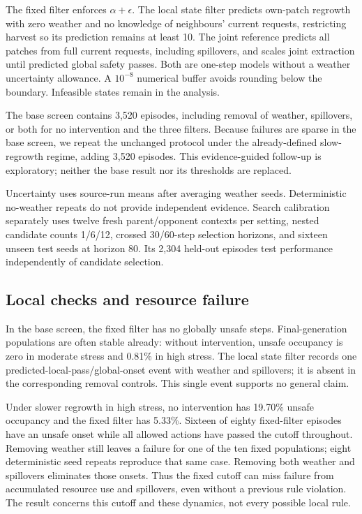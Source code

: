 \documentclass[10pt]{article}
\begin{document}
The fixed filter enforces $\alpha+\epsilon$. The local state filter predicts own-patch regrowth with zero weather and no knowledge of neighbours' current requests, restricting harvest so its prediction remains at least 10. The joint reference predicts all patches from full current requests, including spillovers, and scales joint extraction until predicted global safety passes. Both are one-step models without a weather uncertainty allowance. A $10^{-8}$ numerical buffer avoids rounding below the boundary. Infeasible states remain in the analysis.

The base screen contains 3,520 episodes, including removal of weather, spillovers, or both for no intervention and the three filters. Because failures are sparse in the base screen, we repeat the unchanged protocol under the already-defined slow-regrowth regime, adding 3,520 episodes. This evidence-guided follow-up is exploratory; neither the base result nor its thresholds are replaced.

Uncertainty uses source-run means after averaging weather seeds. Deterministic no-weather repeats do not provide independent evidence. Search calibration separately uses twelve fresh parent/opponent contexts per setting, nested candidate counts 1/6/12, crossed 30/60-step selection horizons, and sixteen unseen test seeds at horizon 80. Its 2,304 held-out episodes test performance independently of candidate selection.

\subsection{Local checks and resource failure}

In the base screen, the fixed filter has no globally unsafe steps. Final-generation populations are often stable already: without intervention, unsafe occupancy is zero in moderate stress and 0.81\% in high stress. The local state filter records one predicted-local-pass/global-onset event with weather and spillovers; it is absent in the corresponding removal controls. This single event supports no general claim.

Under slower regrowth in high stress, no intervention has 19.70\% unsafe occupancy and the fixed filter has 5.33\%. Sixteen of eighty fixed-filter episodes have an unsafe onset while all allowed actions have passed the cutoff throughout. Removing weather still leaves a failure for one of the ten fixed populations; eight deterministic seed repeats reproduce that same case. Removing both weather and spillovers eliminates those onsets. Thus the fixed cutoff can miss failure from accumulated resource use and spillovers, even without a previous rule violation. The result concerns this cutoff and these dynamics, not every possible local rule.
\end{document}
